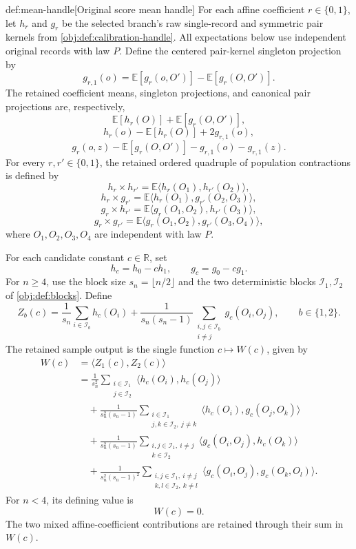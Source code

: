 \begin{algorithmv}{def:mean-handle}[Original score mean handle]
For each affine coefficient \(r\in\{0,1\}\), let \(h_r\) and \(g_r\) be the selected branch's raw single-record and symmetric pair kernels from \cref{obj:def:calibration-handle}. All expectations below use independent original records with law \(P\). Define the centered pair-kernel singleton projection by
\[
g_{r,1}(o)
=
\mathbb E[g_r(o,O')]
-\mathbb E[g_r(O,O')].
\]
The retained coefficient means, singleton projections, and canonical pair projections are, respectively,
\[
\mathbb E[h_r(O)]+\mathbb E[g_r(O,O')],
\]
\[
h_r(o)-\mathbb E[h_r(O)]+2g_{r,1}(o),
\]
\[
g_r(o,z)-\mathbb E[g_r(O,O')]
-g_{r,1}(o)-g_{r,1}(z).
\]
For every \(r,r'\in\{0,1\}\), the retained ordered quadruple of population contractions is defined by
\[
h_r\!\times h_{r'}
=
\mathbb E\langle h_r(O_1),h_{r'}(O_2)\rangle,
\]
\[
h_r\!\times g_{r'}
=
\mathbb E\langle h_r(O_1),g_{r'}(O_2,O_3)\rangle,
\]
\[
g_r\!\times h_{r'}
=
\mathbb E\langle g_r(O_1,O_2),h_{r'}(O_3)\rangle,
\]
\[
g_r\!\times g_{r'}
=
\mathbb E\langle g_r(O_1,O_2),g_{r'}(O_3,O_4)\rangle,
\]
where \(O_1,O_2,O_3,O_4\) are independent with law \(P\).

For each candidate constant \(c\in\mathbb R\), set
\[
h_c=h_0-ch_1,
\qquad
g_c=g_0-cg_1.
\]
For \(n\ge4\), use the block size \(s_n=\lfloor n/2\rfloor\) and the two deterministic blocks \(\mathcal I_1,\mathcal I_2\) of \cref{obj:def:blocks}. Define
\[
Z_b(c)=
\frac1{s_n}\sum_{i\in\mathcal I_b}h_c(O_i)
+
\frac1{s_n(s_n-1)}
\sum_{\substack{i,j\in\mathcal I_b\\i\ne j}}
g_c(O_i,O_j),
\qquad b\in\{1,2\}.
\]
The retained sample output is the single function \(c\mapsto W(c)\), given by
\[
\begin{aligned}
W(c)
&=\langle Z_1(c),Z_2(c)\rangle\\
&=\frac1{s_n^2}
\sum_{\substack{i\in\mathcal I_1\\j\in\mathcal I_2}}
\langle h_c(O_i),h_c(O_j)\rangle\\
&\quad+\frac1{s_n^2(s_n-1)}
\sum_{\substack{i\in\mathcal I_1\\j,k\in\mathcal I_2,\ j\ne k}}
\langle h_c(O_i),g_c(O_j,O_k)\rangle\\
&\quad+\frac1{s_n^2(s_n-1)}
\sum_{\substack{i,j\in\mathcal I_1,\ i\ne j\\k\in\mathcal I_2}}
\langle g_c(O_i,O_j),h_c(O_k)\rangle\\
&\quad+\frac1{s_n^2(s_n-1)^2}
\sum_{\substack{i,j\in\mathcal I_1,\ i\ne j\\k,l\in\mathcal I_2,\ k\ne l}}
\langle g_c(O_i,O_j),g_c(O_k,O_l)\rangle.
\end{aligned}
\]
For \(n<4\), its defining value is
\[
W(c)=0.
\]
The two mixed affine-coefficient contributions are retained through their sum in \(W(c)\).
\end{algorithmv}

